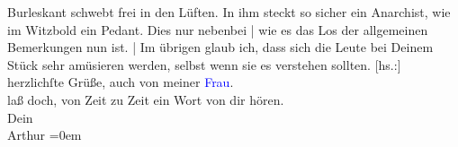                Burleskant schwebt frei in den Lüften. In ihm steckt so sicher ein Anarchist, wie im
               Witzbold ein Pedant. Dies nur nebenbei | wie es das Los der allgemeinen Bemerkungen
               nun ist. | Im übrigen glaub ich, dass sich die Leute bei Deinem Stück sehr amüsieren
               werden, selbst wenn sie es verstehen sollten.\pend
           \pstart
           {[}hs.:{]} herzlichſte Grüße, auch von meiner \textcolor{blue}{Frau}{}.{\\[\baselineskip]}laß doch, von Zeit zu Zeit ein Wort von dir hören.{\\[\baselineskip]}Dein{\\[\baselineskip]}\spacefill\mbox{Arthur}\pend
           \leftskip=0em{}\endnumbering{}  
      